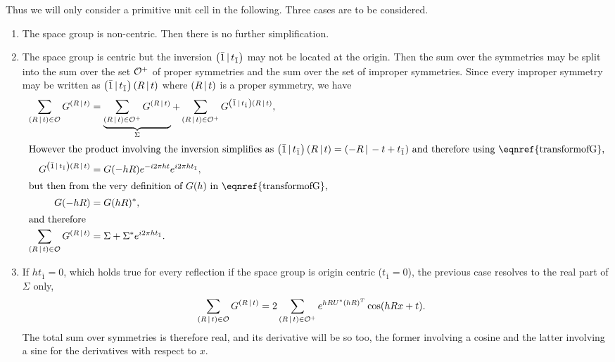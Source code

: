 \documentclass[pdf]{iucr}
\begin{document}
Thus we will only consider a primitive unit cell in the following. Three cases are to be considered.
\begin{enumerate}
\item The space group is non-centric. Then there is no further simplification.
\item The space group is centric but the inversion $\left( \bar{1}\,\vert\, t_{\bar{1}} \right)$ may not be located at the origin. Then the sum over the symmetries may be split into the sum over the set $\cal{O}^+$ of proper symmetries and the sum over the set of  improper symmetries. Since every improper symmetry may be written as $\left( \bar{1}\,\vert\, t_{\bar{1}} \right)\left( R\,\vert\, t \right)$ where $\left( R\,\vert\, t \right)$ is a proper symmetry, we have
\begin{align}
\sum_{\sym{R}{t} \in \cal{O}} G^{\sym{R}{t}} &= 
\underbrace{\sum_{\sym{R}{t} \in \cal{O^+}} G^{\sym{R}{t}} }_{\Sigma} 
+ \sum_{\sym{R}{t} \in \cal{O}^+} G^{\inversion \sym{R}{t}}, \nonumber \\
\shortintertext{However the product involving the inversion simplifies as 
$\inversion\sym{R}{t} = \sym{-R}{-t + t_{\bar{1}}}$ and therefore using \eqnref{transformofG},}
G^{\inversion\sym{R}{t}} &= G(-hR) e^{-i2\pi ht} e^{i2\pi h t_{\bar{1}}}, \nonumber \\
 \shortintertext{but then from the very definition of $G(h)$ in \eqnref{transformofG},}
 G(-hR) &= G(hR)^*, \\
 \shortintertext{and therefore}
 \sum_{\sym{R}{t} \in \cal{O}} G^{\sym{R}{t}} &= \Sigma + \Sigma^* e^{i2\pi h t_{\bar{1}}}.
 \label{eqn:sumofGforcentricgroups}
\end{align}

\item If $h t_{\bar{1}}=0$, which holds true for every reflection if the space group is origin centric ($t_{\bar{1}}=0$), the previous case resolves to the real part of $\Sigma$ only,
\begin{align}
 \sum_{\left( R\,\vert\, t \right) \in \cal{O}} G^{\left( R\,\vert\, t \right)} & = 2 \sum_{\left( R\,\vert\, t \right) \in \cal{O}^+}  e^{h R U^* (hR)^T} \cos(hRx + t).
\end{align}
The total sum over symmetries is therefore real, and its derivative will be so too, the former involving a cosine and the latter involving a sine for the derivatives with respect to $x$. 
\end{enumerate}
\end{document}
